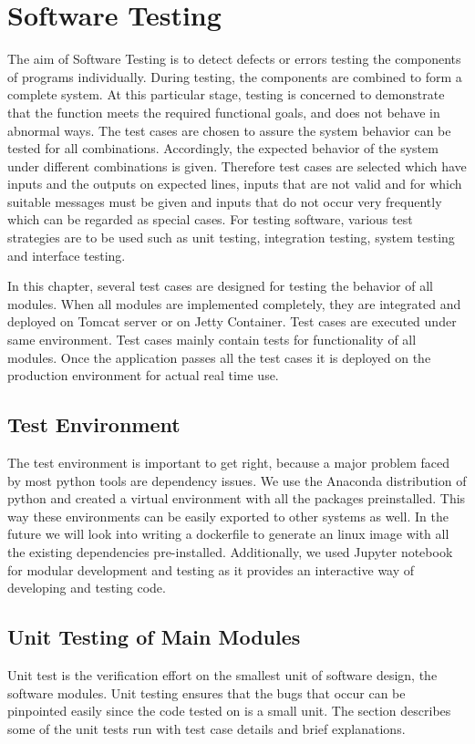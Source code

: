 \chapter{Software Testing}
The aim of Software Testing is to detect defects or errors testing the components of programs individually. During testing, the components are combined to form a complete system. At this particular stage, testing is concerned to demonstrate that the function meets the required functional goals, and does not behave in abnormal ways. The test cases are chosen to assure the system behavior can be tested for all combinations. Accordingly, the expected behavior of the system under different combinations is given. Therefore test cases are selected which have inputs and the outputs on expected lines, inputs that are not valid and for which suitable messages must be given and inputs that do not occur very frequently which can be regarded as special cases.  For testing software, various test strategies are to be used such as unit testing, integration testing, system testing and interface testing.

In this chapter, several test cases are designed for testing the behavior of all modules. When all modules are implemented completely, they are integrated and deployed on Tomcat server or on Jetty Container. Test cases are executed under same environment. Test cases mainly contain tests for functionality of all modules. Once the application passes all the test cases it is deployed on the production environment for actual real time use.


\section{Test Environment}
The test environment is important to get right, because a major problem faced by most python tools are dependency issues. We use the Anaconda distribution of python and created a virtual environment with all the packages preinstalled. This way these environments can be easily exported to other systems as well. In the future we will look into writing a dockerfile to generate an linux image with all the existing dependencies pre-installed. Additionally, we used Jupyter notebook for modular development and testing as it provides an interactive way of developing and testing code.

\section{Unit Testing of Main Modules}
Unit test is the verification effort on the smallest unit of software design, the software modules. Unit testing ensures that the bugs that occur can be pinpointed easily since the code tested on is a small unit. The section describes some of the unit tests run with test case details and brief explanations.


